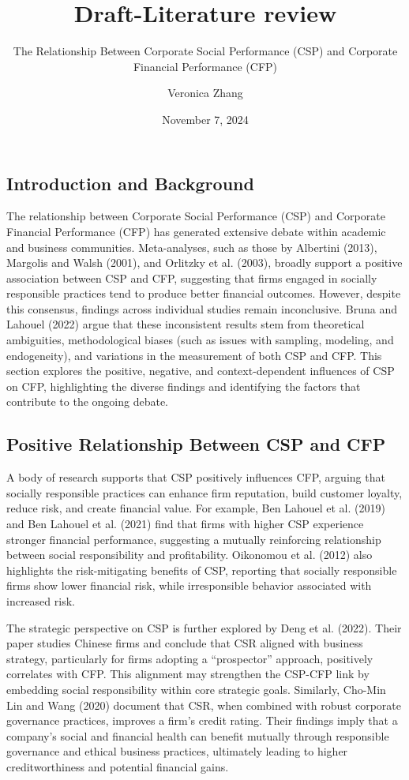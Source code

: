 \documentclass[
  letterpaper,
  DIV=11,
  numbers=noendperiod]{scrartcl}
\title{Draft-Literature review}
\subtitle{The Relationship Between Corporate Social Performance (CSP)
and Corporate Financial Performance (CFP)}
\author{Veronica Zhang}
\date{November 7, 2024}
\begin{document}
\maketitle


\subsection{Introduction and
Background}\label{introduction-and-background}

The relationship between Corporate Social Performance (CSP) and
Corporate Financial Performance (CFP) has generated extensive debate
within academic and business communities. Meta-analyses, such as those
by Albertini (2013), Margolis and Walsh (2001), and Orlitzky et al.
(2003), broadly support a positive association between CSP and CFP,
suggesting that firms engaged in socially responsible practices tend to
produce better financial outcomes. However, despite this consensus,
findings across individual studies remain inconclusive. Bruna and
Lahouel (2022) argue that these inconsistent results stem from
theoretical ambiguities, methodological biases (such as issues with
sampling, modeling, and endogeneity), and variations in the measurement
of both CSP and CFP. This section explores the positive, negative, and
context-dependent influences of CSP on CFP, highlighting the diverse
findings and identifying the factors that contribute to the ongoing
debate.

\subsection{Positive Relationship Between CSP and
CFP}\label{positive-relationship-between-csp-and-cfp}

A body of research supports that CSP positively influences CFP, arguing
that socially responsible practices can enhance firm reputation, build
customer loyalty, reduce risk, and create financial value. For example,
Ben Lahouel et al. (2019) and Ben Lahouel et al. (2021) find that firms
with higher CSP experience stronger financial performance, suggesting a
mutually reinforcing relationship between social responsibility and
profitability. Oikonomou et al. (2012) also highlights the
risk-mitigating benefits of CSP, reporting that socially responsible
firms show lower financial risk, while irresponsible behavior associated
with increased risk.

The strategic perspective on CSP is further explored by Deng et al.
(2022). Their paper studies Chinese firms and conclude that CSR aligned
with business strategy, particularly for firms adopting a ``prospector''
approach, positively correlates with CFP. This alignment may strengthen
the CSP-CFP link by embedding social responsibility within core
strategic goals. Similarly, Cho-Min Lin and Wang (2020) document that
CSR, when combined with robust corporate governance practices, improves
a firm's credit rating. Their findings imply that a company's social and
financial health can benefit mutually through responsible governance and
ethical business practices, ultimately leading to higher
creditworthiness and potential financial gains.
\end{document}
